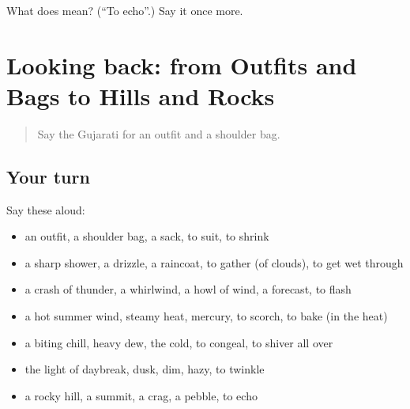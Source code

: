 \begin{tcolorbox}[breakable,colback=teal!4,colframe=teal!35!black,title={Before you move on}]
What does  mean? (\textquotedblleft{}To echo\textquotedblright{}.) Say it once more.
\end{tcolorbox}
\section[(dialogue)]{Looking back: from Outfits and Bags to Hills and Rocks}

\label{lesson:GU-R439-review-433-439}



\begin{quote}
Say the Gujarati for an outfit and a shoulder bag.
\end{quote}

\subsection*{Your turn}
Say these aloud:

\begin{itemize}
\raggedright
  \item an outfit, a shoulder bag, a sack, to suit, to shrink
  \item a sharp shower, a drizzle, a raincoat, to gather (of clouds), to get wet through
  \item a crash of thunder, a whirlwind, a howl of wind, a forecast, to flash
  \item a hot summer wind, steamy heat, mercury, to scorch, to bake (in the heat)
  \item a biting chill, heavy dew, the cold, to congeal, to shiver all over
  \item the light of daybreak, dusk, dim, hazy, to twinkle
  \item a rocky hill, a summit, a crag, a pebble, to echo
\end{itemize}

